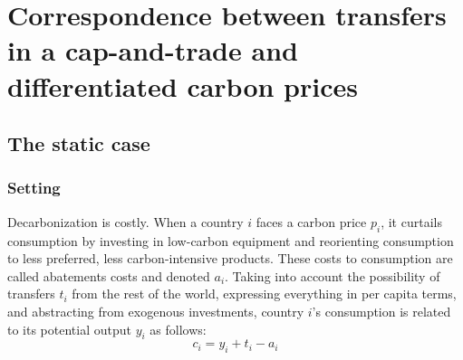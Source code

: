 \documentclass[12pt,english]{article}
\begin{document}


\clearpage
\renewcommand{\url}[1]{\href{#1}{Link}} %


\appendix

\renewcommand{\thetable}{A\arabic{table}}
\renewcommand{\thefigure}{A\arabic{figure}}
\setcounter{figure}{0}
\setcounter{table}{0}


\section{Correspondence between transfers in a cap-and-trade and
differentiated carbon
prices}\label{app:correspondence}

\subsection{The static case}\label{the-static-case}

\subsubsection*{Setting}\label{setting}

Decarbonization is costly. When a country $i$ faces a carbon price $p_i$, it curtails consumption by investing in low-carbon equipment and reorienting consumption to less preferred, less carbon-intensive products. These costs to consumption are called abatements costs and denoted $a_i$. Taking into account the possibility of transfers $t_i$ from the rest of the world, expressing everything in per capita terms, and abstracting from exogenous investments, country $i$'s consumption is related to its potential output $y_i$ as follows:
$$c_i = y_i + t_i - a_i$$
\end{document}
